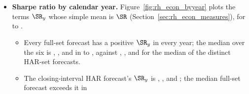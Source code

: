 \begin{itemize}
  \rhemHalfSpreadMed\% of the premium on the \rheSzDays{} post-warmup days (\rhemHalfSpreadMedAll\% on all
  \cmNdays{} days of $\mathcal T_{\mathrm{opt}}$). We scale every day's quoted half-spread
  $h_t = (P^{a}_t - P^{b}_t)/2$ by a common factor $k$, so that a purchase pays $P_t + k h_t$ and a sale receives
  $P_t - k h_t$ ($k = 0$: mid-quotes; $k = 1$: quoted bid/ask prices), and find the factor at which the mean daily
  return or the Sharpe ratio reaches zero; in percent of the premium, the break-even half-spread is $k$ times the
  median quoted half-spread.
  \begin{itemize}
  \item For the six full-set forecasts the mean daily return stays positive up to $k = \rhemBeMeanFullMin$ to
    $\rhemBeMeanFullMax$ (\rhemBeMeanFullMinPct\% to \rhemBeMeanFullMaxPct\% of the premium) and the Sharpe ratio up
    to $k = \rhemBeShFullMin$ to $\rhemBeShFullMax$ (\rhemBeShFullMinPct\% to \rhemBeShFullMaxPct\%).
  \item For the closing-interval HAR forecast the two factors are \rhemBeMeanCiHar{} and \rhemBeShCiHar{}
    (\rhemBeMeanPctCiHar\% and \rhemBeShPctCiHar\% of the premium); for the \rhemHarDistinctWord{} distinct HAR-set
    forecasts the Sharpe-ratio factor runs from \rhemBeShHarMin{} to \rhemBeShHarMax.
  \item The mean daily return of the short straddle reaches zero at $k = \rhemBeMeanShort$, inside the quoted
    spread, and its Sharpe ratio is negative at mid-quotes already.
  \end{itemize}
\item \textbf{Sharpe ratio by calendar year.} Figure~\ref{fig:rh_econ_byyear} plots the terms $\SR_y$ whose simple
  mean is $\SR$ (Section~\ref{sec:rh_econ_measures}), for \rhemYearOne{} to \rhemYearFour{}.
  \begin{itemize}
  \item Every full-set forecast has a positive $\SR_y$ in every year; the median over the six is \rhemByYearFullMedOne, \rhemByYearFullMedTwo, \rhemByYearFullMedThree{} and
    \rhemByYearFullMedFour{} in \rhemYearOne{} to \rhemYearFour, against \rhemByYearHarMedOne,
    \rhemByYearHarMedTwo, \rhemByYearHarMedThree{} and \rhemByYearHarMedFour{} for the median of the
    \rhemHarDistinctWord{} distinct HAR-set forecasts.
  \item The closing-interval HAR forecast's $\SR_y$ is \rhemByYearCiHarOne, \rhemByYearCiHarTwo,
    \rhemByYearCiHarThree{} and \rhemByYearCiHarFour; the median full-set forecast exceeds it in

\end{itemize}
\end{itemize}

